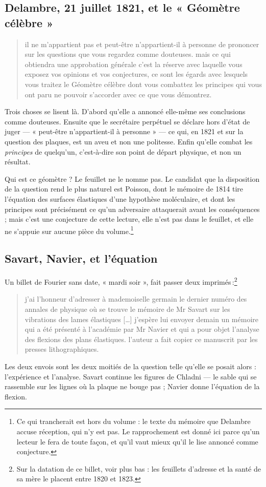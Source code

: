 \documentclass[11pt,a4paper]{article}
\begin{document}
\subsection*{Delambre, 21 juillet 1821, et le « Géomètre célèbre »}

\begin{quote}
il ne m'appartient pas et peut-être n'appartient-il à personne de prononcer sur
les questions que vous regardez comme douteuses. mais ce qui obtiendra une
approbation générale c'est la réserve avec laquelle vous exposez vos opinions
et vos conjectures, ce sont les égards avec lesquels vous traitez le Géomètre
célèbre dont vous combattez les principes qui vous ont paru ne pouvoir
s'accorder avec ce que vous démontrez.
\end{quote}
Trois choses se lisent là. D'abord qu'elle a annoncé elle-même ses conclusions
comme douteuses. Ensuite que le secrétaire perpétuel se déclare hors d'état de
juger --- « peut-être n'appartient-il à personne » --- ce qui, en 1821 et sur
la question des plaques, est un aveu et non une politesse. Enfin qu'elle
combat les \emph{principes} de quelqu'un, c'est-à-dire son point de départ
physique, et non un résultat.

Qui est ce géomètre ? Le feuillet ne le nomme pas. Le candidat que la
disposition de la question rend le plus naturel est Poisson, dont le mémoire de
1814 tire l'équation des surfaces élastiques d'une hypothèse moléculaire, et
dont les principes sont précisément ce qu'un adversaire attaquerait avant les
conséquences ; mais c'est une conjecture de cette lecture, elle n'est pas dans
le feuillet, et elle ne s'appuie sur aucune pièce du volume.\footnote{Ce qui
trancherait est hors du volume : le texte du mémoire que Delambre accuse
réception, qui n'y est pas. Le rapprochement est donné ici parce qu'un lecteur
le fera de toute façon, et qu'il vaut mieux qu'il le lise annoncé comme
conjecture.}

\subsection*{Savart, Navier, et l'équation}

Un billet de Fourier sans date, « mardi soir », fait passer deux
imprimés\,:\footnote{Sur la datation de ce billet, voir plus bas : les
feuillets d'adresse et la santé de sa mère le placent entre 1820 et 1823.}
\begin{quote}
j'ai l'honneur d'adresser à mademoiselle germain le dernier numéro des annales
de physique où se trouve le mémoire de Mr Savart sur les vibrations des lames
élastiques […] j'espère lui envoyer demain un mémoire qui a été présenté à
l'académie par Mr Navier et qui a pour objet l'analyse des flexions des plans
élastiques. l'auteur a fait copier ce manuscrit par les presses
lithographiques.
\end{quote}
Les deux envois sont les deux moitiés de la question telle qu'elle se posait
alors : l'expérience et l'analyse. Savart continue les figures de Chladni ---
le sable qui se rassemble sur les lignes où la plaque ne bouge pas ; Navier
donne l'équation de la flexion.
\end{document}
